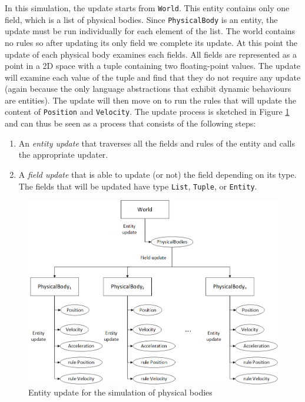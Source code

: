 \noindent
In this simulation, the update starts from \texttt{World}. This entity contains only one field, which is a list of physical bodies. Since \texttt{PhysicalBody} is an entity, the update must be run individually for each element of the list. The world contains no rules so after updating its only field we complete its update. At this point the update of each physical body examines each fields. All fields are represented as a point in a 2D space with a tuple containing two floating-point values. The update will examine each value of the tuple and find that they do not require any update (again because the only language abstractions that exhibit dynamic behaviours are entities). The update will then move on to run the rules that will update the content of \texttt{Position} and \texttt{Velocity}. The update process is sketched in Figure \ref{fig:ch_networking_simulation_update} and can thus be seen as a process that consists of the following steps:

\begin{enumerate}[noitemsep]
	\item An \textit{entity update} that traverses all the fields and rules of the entity and calls the appropriate updater.
	\item A \textit{field update} that is able to update (or not) the field depending on its type. The fields that will be updated have type \texttt{List}, \texttt{Tuple}, or \texttt{Entity}.
\end{enumerate}

\begin{figure}
	\centering
	\includegraphics[width=\textwidth]{Figures/chapter_networking/update_traversal}
	\caption{Entity update for the simulation of physical bodies}
	\label{fig:ch_networking_simulation_update}
\end{figure}

